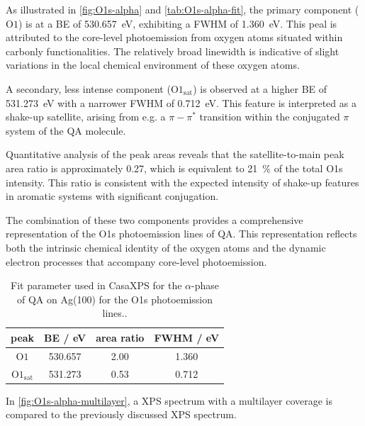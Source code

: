 As illustrated in \autoref{fig:O1s-alpha} and \autoref{tab:O1s-alpha-fit}, the primary component ($\mathrm{O1}$) is at a \ac{BE} of 530.657~\si{\eV}, exhibiting a \ac{FWHM} of 1.360~\si{\eV}. This peal is attributed to the core-level photoemission from oxygen atoms situated within carbonly functionalities. The relatively broad linewidth is indicative of slight variations in the local chemical environment of these oxygen atoms.

A secondary, less intense component ($\mathrm{O1_{sat}}$) is observed at a higher \ac{BE} of 531.273~\si{\eV} with a narrower \ac{FWHM} of 0.712~\si{\eV}. This feature is interpreted as a shake-up satellite, arising from e.g. a $\pi-\pi^*$ transition within the conjugated $\pi$ system of the \ac{QA} molecule.

Quantitative analysis of the peak areas reveals that the satellite-to-main peak area ratio is approximately 0.27, which is equivalent to 21~\% of the total O1s intensity. This ratio is consistent with the expected intensity of shake-up features in aromatic systems with significant conjugation.\autocite{Bauer2014}

The combination of these two components provides a comprehensive representation of the O1s photoemission lines of \ac{QA}. This representation reflects both the intrinsic chemical identity of the oxygen atoms and the dynamic electron processes that accompany core-level photoemission.

\begin{table}[H]
	\centering
	\caption{Fit parameter used in CasaXPS\autocite{CasaSoftwareLtd2022} for the $\alpha$-phase of \ac{QA} on Ag(100) for the O1s photoemission lines..}
	\begin{tabular}{|c|c|c|c|}
		\hline
		peak & \ac{BE} / eV & area ratio & FWHM / eV \\
		\hline
		$\mathrm{O1}$ & 530.657 & 2.00 & 1.360 \\ \hline
		$\mathrm{O1_{sat}}$ & 531.273 & 0.53 & 0.712 \\ \hline
	\end{tabular}
	\label{tab:O1s-alpha-fit}
\end{table}

In \autoref{fig:O1s-alpha-multilayer}, a \ac{XPS} spectrum with a multilayer coverage is compared to the previously discussed \ac{XPS} spectrum.

